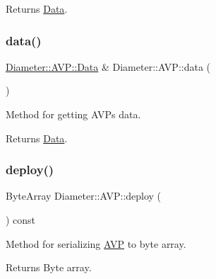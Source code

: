 \begin{DoxyReturn}{Returns}
\hyperlink{classDiameter_1_1AVP_1_1Data}{Data}. 
\end{DoxyReturn}
\mbox{\label{classDiameter_1_1AVP_a49f5fad4dbdf9ffe49c16d3d975df3c5}} 
\subsubsection{\texorpdfstring{data()}{data()}\hspace{0.1cm}{\footnotesize\ttfamily [2/2]}}
{\footnotesize\ttfamily \hyperlink{classDiameter_1_1AVP_1_1Data}{Diameter\+::\+A\+V\+P\+::\+Data} \& Diameter\+::\+A\+V\+P\+::data (\begin{DoxyParamCaption}{ }\end{DoxyParamCaption})}



Method for getting A\+V\+Ps data. 

\begin{DoxyReturn}{Returns}
\hyperlink{classDiameter_1_1AVP_1_1Data}{Data}. 
\end{DoxyReturn}
\mbox{\label{classDiameter_1_1AVP_acb802bb9d8980848852b226c26bf4cb1}} 
\subsubsection{\texorpdfstring{deploy()}{deploy()}\hspace{0.1cm}{\footnotesize\ttfamily [1/2]}}
{\footnotesize\ttfamily Byte\+Array Diameter\+::\+A\+V\+P\+::deploy (\begin{DoxyParamCaption}{ }\end{DoxyParamCaption}) const}



Method for serializing \hyperlink{classDiameter_1_1AVP}{A\+VP} to byte array. 

\begin{DoxyReturn}{Returns}
Byte array. 
\end{DoxyReturn}
\mbox{\label{classDiameter_1_1AVP_a9ac8102ba4fdc09a1df4904b4517c3d3}} 
